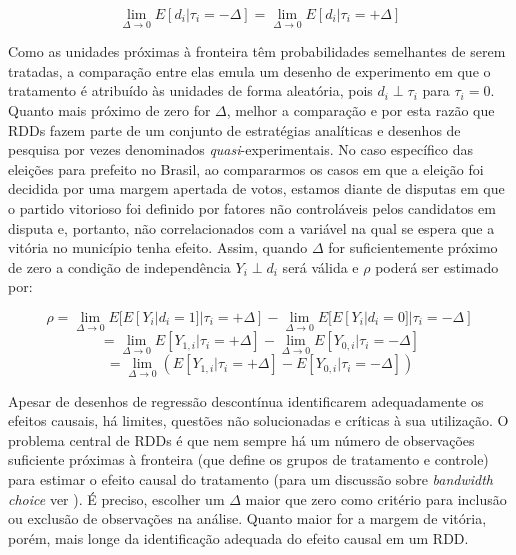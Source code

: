 \[
\lim_{\Delta \to 0} E[d_{i}|\tau_{i}=-\Delta]=\lim_{\Delta \to 0} E[d_{i}|\tau_{i}=+\Delta]
\]

Como as unidades próximas à fronteira têm probabilidades semelhantes de serem tratadas, a comparação entre elas emula um desenho de experimento em que o tratamento é atribuído às unidades de forma aleatória, pois $d_{i}\perp\tau_{i}$ para $\tau_{i}=0$. Quanto mais próximo de zero for $\Delta$, melhor a comparação e por esta razão que RDDs fazem parte de um conjunto de estratégias analíticas e desenhos de pesquisa por vezes denominados \emph{quasi}-experimentais. No caso específico das eleições para prefeito no Brasil, ao compararmos os casos em que a eleição foi decidida por uma margem apertada de votos, estamos diante de disputas em que o partido vitorioso foi definido por fatores não controláveis pelos candidatos em disputa e, portanto, não correlacionados com a variável na qual se espera que a vitória no município tenha efeito. Assim, quando $\Delta$ for suficientemente próximo de zero a condição de independência $Y_{i} \perp d_{i}$ será válida e $\rho$ poderá ser estimado por: 

\[\rho =\lim_{\Delta \to 0} E[E[Y_{i}|d_{i}=1]|\tau_{i}=+\Delta] - \lim_{\Delta \to 0} E[E[Y_{i}|d_{i}=0]|\tau_{i}=-\Delta]\]
\[=\lim_{\Delta \to 0} E[Y_{1,i}|\tau_{i}=+\Delta] - \lim_{\Delta \to 0} E[Y_{0,i}|\tau_{i}=-\Delta]\]
\[=\lim_{\Delta \to 0} (E[Y_{1,i}|\tau_{i}=+\Delta] - E[Y_{0,i}|\tau_{i}=-\Delta])\]

Apesar de desenhos de regressão descontínua identificarem adequadamente os efeitos causais, há limites, questões não solucionadas e críticas à sua utilização. O problema central de RDDs é que nem sempre há um número de observações suficiente próximas à fronteira (que define os grupos de tratamento e controle) para estimar o efeito causal do tratamento (para um discussão sobre \emph{bandwidth choice} ver \citealp{McCrary2008, Green2009, Imbens2011}). É preciso, escolher um $\Delta$ maior que zero como critério para inclusão ou exclusão de observações na análise. Quanto maior for a margem de vitória, porém, mais longe da identificação adequada do efeito causal em um RDD.

